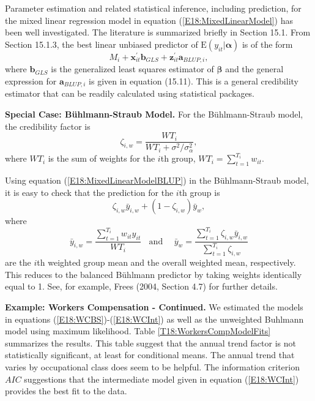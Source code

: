 \linejed

Parameter estimation and related statistical inference, including
prediction, for the mixed linear regression model in equation
(\ref{E18:MixedLinearModel}) has been well investigated. The
literature is summarized briefly in Section 15.1. From Section
15.1.3, the best linear unbiased predictor of $\mathrm{E}(y_{it} |
\boldsymbol \alpha)$ is of the form
\begin{equation}\label{E18:MixedLinearModelBLUP}
M_i + \mathbf{x}_{it}^{\prime} \mathbf{b}_{GLS}+
\mathbf{z}_{it}^{\prime} \mathbf{a}_{BLUP,i},
\end{equation}
where $\mathbf{b}_{GLS}$ is the generalized least squares estimator
of $\boldsymbol \beta$ and the general expression for
$\mathbf{a}_{BLUP,i}$ is given in equation (15.11). This is a
general credibility estimator that can be readily calculated using
statistical packages.


\linejed

\textbf{Special Case: B\"{u}hlmann-Straub Model.} For the
B\"{u}hlmann-Straub model, the credibility factor is
\begin{equation*}
\zeta_{i,w} = \frac{WT_i}{WT_i + \sigma^2/\sigma^2_{\alpha}},
\end{equation*}
where $WT_i$ is the sum of weights for the $i$th group, $WT_i =
\sum_{t=1}^{T_i} w_{it}$.

Using equation (\ref{E18:MixedLinearModelBLUP}) in the
B\"{u}hlmann-Straub model, it is easy to check that the prediction
for the $i$th group is
\begin{equation*}
 \zeta_{i,w}  \bar{y}_{i,w} + (1-\zeta_{i,w} ) \bar{y}_w ,
\end{equation*}
where
\begin{equation*}
\bar{y}_{i,w} =\frac{\sum_{t=1}^{T_i} w_{it}y_{it}}{WT_i}
~~~~\mathrm{and}~~~~~~\bar{y}_w =\frac{\sum_{t=1}^{T_i} \zeta_{i,w}
\bar{y}_{i,w}}{\sum_{t=1}^{T_i} \zeta_{i,w} }
\end{equation*}
are the $i$th weighted group mean and the overall weighted mean,
respectively. This reduces to the balanced B\"{u}hlmann predictor by
taking weights identically equal to 1. See, for example, Frees
(2004, Section 4.7) for further details.





\linejed

\textbf{ Example: Workers Compensation - Continued.} We estimated
the models in equations (\ref{E18:WCBS})-(\ref{E18:WCInt}) as well
as the unweighted Buhlmann model using maximum likelihood. Table
\ref{T18:WorkersCompModelFits} summarizes the results. This table
suggest that the annual trend factor is not statistically
significant, at least for conditional means. The annual trend that
varies by occupational class does seem to be helpful. The
information criterion $AIC$ suggestions that the intermediate model
given in equation (\ref{E18:WCInt}) provides the best fit to the
data.


